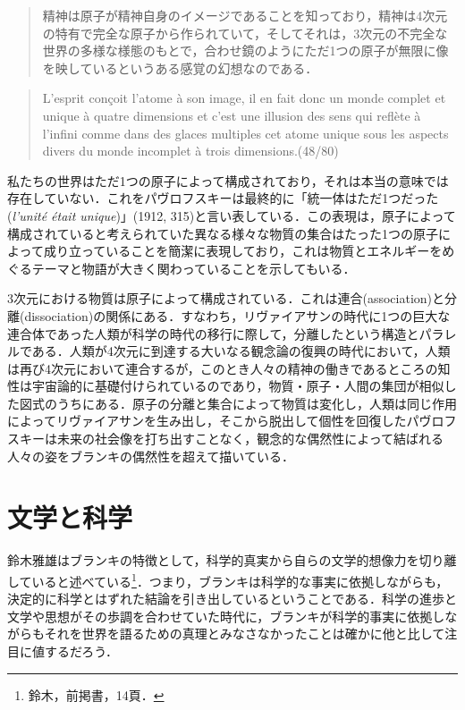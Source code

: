 \begin{quote}
  精神は原子が精神自身のイメージであることを知っており，精神は4次元の特有で完全な原子から作られていて，そしてそれは，3次元の不完全な世界の多様な様態のもとで，合わせ鏡のようにただ1つの原子が無限に像を映しているというある感覚の幻想なのである．
\end{quote}
\begin{quote}
  L'esprit conçoit l'atome à son image, il en fait donc un monde complet et unique à quatre dimensions et c'est une illusion des sens qui reflète à l'infini comme dans des glaces multiples cet atome unique sous les aspects divers du monde incomplet à trois dimensions.(48/80)
\end{quote}

私たちの世界はただ1つの原子によって構成されており，それは本当の意味では存在していない．これをパヴロフスキーは最終的に「統一体はただ1つだった(\emph{l'unité était unique})」(1912, 315)と言い表している．この表現は，原子によって構成されていると考えられていた異なる様々な物質の集合はたった1つの原子によって成り立っていることを簡潔に表現しており，これは物質とエネルギーをめぐるテーマと物語が大きく関わっていることを示してもいる．

3次元における物質は原子によって構成されている．これは連合(association)と分離(dissociation)の関係にある．すなわち，リヴァイアサンの時代に1つの巨大な連合体であった人類が科学の時代の移行に際して，分離したという構造とパラレルである．人類が4次元に到達する大いなる観念論の復興の時代において，人類は再び4次元において連合するが，このとき人々の精神の働きであるところの知性は宇宙論的に基礎付けられているのであり，物質・原子・人間の集団が相似した図式のうちにある．原子の分離と集合によって物質は変化し，人類は同じ作用によってリヴァイアサンを生み出し，そこから脱出して個性を回復したパヴロフスキーは未来の社会像を打ち出すことなく，観念的な偶然性によって結ばれる人々の姿をブランキの偶然性を超えて描いている．

\section{文学と科学}

鈴木雅雄はブランキの特徴として，科学的真実から自らの文学的想像力を切り離していると述べている\footnote{鈴木，前掲書，14頁．}．つまり，ブランキは科学的な事実に依拠しながらも，決定的に科学とはずれた結論を引き出しているということである．科学の進歩と文学や思想がその歩調を合わせていた時代に，ブランキが科学的事実に依拠しながらもそれを世界を語るための真理とみなさなかったことは確かに他と比して注目に値するだろう．

